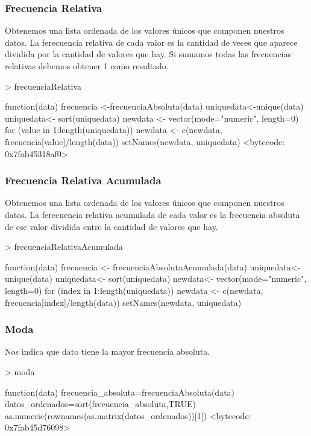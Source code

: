 \documentclass [a4paper] {article}
\begin{document}
\subsubsection{Frecuencia Relativa}
Obtenemos una lista ordenada de los valores únicos que componen nuestros datos.
La ferecuencia relativa de cada valor es la cantidad de veces que aparece dividida por la cantidad de valores que hay.
Si sumamos todas las frecuencias relativas debemos obtener 1 como resultado.
\begin{Schunk}
\begin{Sinput}
> frecuenciaRelativa
\end{Sinput}
\begin{Soutput}
function(data){
  frecuencia <-frecuenciaAbsoluta(data)
  uniquedata<-unique(data)
  uniquedata<- sort(uniquedata)
  newdata <- vector(mode="numeric", length=0)
  for (value in 1:length(uniquedata)) {
    newdata <- c(newdata, frecuencia[value]/length(data))
  }
  setNames(newdata, uniquedata)
}
<bytecode: 0x7fab45318af0>
\end{Soutput}
\end{Schunk}
\subsubsection{Frecuencia Relativa Acumulada}
Obtenemos una lista ordenada de los valores únicos que componen nuestros datos.
La ferecuencia relativa acumulada de cada valor es la frecuencia absoluta de ese valor dividida entre la cantidad de valores que hay.
\begin{Schunk}
\begin{Sinput}
> frecuenciaRelativaAcumulada
\end{Sinput}
\begin{Soutput}
function(data){
  frecuencia <- frecuenciaAbsolutaAcumulada(data)
  uniquedata<-unique(data)
  uniquedata<- sort(uniquedata)
  newdata<- vector(mode="numeric", length=0)
  for (index in 1:length(uniquedata)) {
    newdata <- c(newdata, frecuencia[index]/length(data))
  }
  setNames(newdata, uniquedata)
}
\end{Soutput}
\end{Schunk}
\subsubsection{Moda}
Nos indica que dato tiene la mayor frecuencia absoluta.
\begin{Schunk}
\begin{Sinput}
> moda
\end{Sinput}
\begin{Soutput}
function(data) {
  frecuencia_absoluta=frecuenciaAbsoluta(data)
  datos_ordenados=sort(frecuencia_absoluta,TRUE)
  as.numeric(rownames(as.matrix(datos_ordenados))[1])
}
<bytecode: 0x7fab45d76098>
\end{Soutput}
\end{Schunk}
\end{document}
